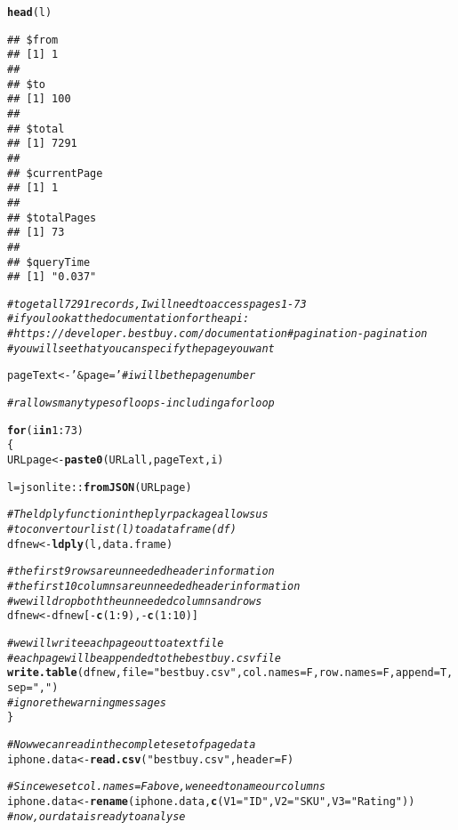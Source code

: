 \documentclass{article}\usepackage[]{graphicx}\usepackage[]{color}
\makeatletter
\newcommand{\hlnum}[1]{\textcolor[rgb]{0.686,0.059,0.569}{#1}}%
\newcommand{\hlstr}[1]{\textcolor[rgb]{0.192,0.494,0.8}{#1}}%
\newcommand{\hlcom}[1]{\textcolor[rgb]{0.678,0.584,0.686}{\textit{#1}}}%
\newcommand{\hlopt}[1]{\textcolor[rgb]{0,0,0}{#1}}%
\newcommand{\hlstd}[1]{\textcolor[rgb]{0.345,0.345,0.345}{#1}}%
\newcommand{\hlkwa}[1]{\textcolor[rgb]{0.161,0.373,0.58}{\textbf{#1}}}%
\newcommand{\hlkwb}[1]{\textcolor[rgb]{0.69,0.353,0.396}{#1}}%
\newcommand{\hlkwc}[1]{\textcolor[rgb]{0.333,0.667,0.333}{#1}}%
\newcommand{\hlkwd}[1]{\textcolor[rgb]{0.737,0.353,0.396}{\textbf{#1}}}%
\newenvironment{kframe}{%
 \def\at@end@of@kframe{}%
 \ifinner\ifhmode%
  \def\at@end@of@kframe{\end{minipage}}%
  \begin{minipage}{\columnwidth}%
 \fi\fi%
 \def\FrameCommand##1{\hskip\@totalleftmargin \hskip-\fboxsep
 \colorbox{shadecolor}{##1}\hskip-\fboxsep
     \hskip-\linewidth \hskip-\@totalleftmargin \hskip\columnwidth}%
 \MakeFramed {\advance\hsize-\width
   \@totalleftmargin\z@ \linewidth\hsize
   \@setminipage}}%
 {\par\unskip\endMakeFramed%
 \at@end@of@kframe}
\newenvironment{knitrout}{}{} %
\makeatother
\begin{document}
\begin{knitrout}
\begin{kframe}
\begin{alltt}
\hlkwd{head}\hlstd{(l)}
\end{alltt}
\begin{verbatim}
## $from
## [1] 1
## 
## $to
## [1] 100
## 
## $total
## [1] 7291
## 
## $currentPage
## [1] 1
## 
## $totalPages
## [1] 73
## 
## $queryTime
## [1] "0.037"
\end{verbatim}
\begin{alltt}
\hlcom{# to get all 7291 records, I will need to access pages 1-73}
\hlcom{# if you look at the documentation for the api:}
\hlcom{# https://developer.bestbuy.com/documentation#pagination-pagination}
\hlcom{# you will see that you can specify the page you want}

\hlstd{pageText} \hlkwb{<-} \hlstr{'&page='} \hlcom{# i will be the page number}

\hlcom{# r allows many types of loops - including a for loop}

\hlkwa{for} \hlstd{(i} \hlkwa{in}  \hlnum{1}\hlopt{:}\hlnum{73}\hlstd{)}
\hlstd{\{}
  \hlstd{URLpage} \hlkwb{<-}\hlkwd{paste0}\hlstd{(URLall, pageText, i)}

  \hlstd{l} \hlkwb{=} \hlstd{jsonlite}\hlopt{::}\hlkwd{fromJSON}\hlstd{(URLpage)}

  \hlcom{# The ldply function in the plyr package allows us }
  \hlcom{#  to convert our list (l) to a dataframe (df)}
  \hlstd{dfnew} \hlkwb{<-} \hlkwd{ldply} \hlstd{(l, data.frame)}

  \hlcom{# the first 9 rows are unneeded header information}
  \hlcom{# the first 10 columns are unneeded header information}
  \hlcom{# we will drop both the unneeded columns and rows}
  \hlstd{dfnew}\hlkwb{<-}\hlstd{dfnew[}\hlopt{-}\hlkwd{c}\hlstd{(}\hlnum{1}\hlopt{:}\hlnum{9}\hlstd{),}\hlopt{-}\hlkwd{c}\hlstd{(}\hlnum{1}\hlopt{:}\hlnum{10}\hlstd{)]}

  \hlcom{# we will write each page out to a text file}
  \hlcom{# each page will be appended to the bestbuy.csv file}
  \hlkwd{write.table}\hlstd{(dfnew,} \hlkwc{file}\hlstd{=}\hlstr{"bestbuy.csv"}\hlstd{,} \hlkwc{col.names}\hlstd{=F,} \hlkwc{row.names}\hlstd{=F,} \hlkwc{append}\hlstd{=T,} \hlkwc{sep}\hlstd{=}\hlstr{","}\hlstd{)}
  \hlcom{# ignore the warning messages}
\hlstd{\}}

\hlcom{# Now we can read in the complete set of page data}
\hlstd{iphone.data} \hlkwb{<-}\hlkwd{read.csv}\hlstd{(}\hlstr{"bestbuy.csv"}\hlstd{,} \hlkwc{header} \hlstd{= F)}

\hlcom{# Since we set col.names=F above, we need to name our columns}
\hlstd{iphone.data}\hlkwb{<-}\hlkwd{rename}\hlstd{(iphone.data,}\hlkwd{c}\hlstd{(}\hlkwc{V1}\hlstd{=}\hlstr{"ID"}\hlstd{,} \hlkwc{V2}\hlstd{=}\hlstr{"SKU"}\hlstd{,} \hlkwc{V3} \hlstd{=} \hlstr{"Rating"}\hlstd{))}
\hlcom{# now, our data is ready to analyse}
\end{alltt}
\end{kframe}
\end{knitrout}
\end{document}
